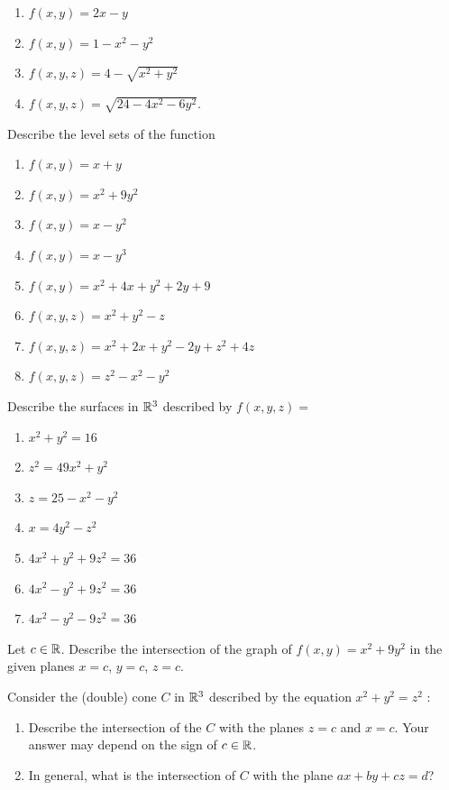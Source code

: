 \begin{exerciselist}
\begin{enumerate}[label=(\alph*)]
        \item $f(x,y)=2x-y$
        \item $f(x,y)=1-x^2-y^2$
        \item $f(x,y,z)=4-\sqrt{x^2+y^2}$
        \item $f(x,y,z)=\sqrt{24-4x^2-6y^2}$.
    \end{enumerate}
    \item Describe the level sets of the function \begin{enumerate}[label=(\alph*)]
        \item $f(x,y)=x+y$
        \item $f(x,y)=x^2+9y^2$
        \item $f(x,y)=x-y^2$
        \item $f(x,y)=x-y^3$
        \item $f(x,y)=x^2+4x+y^2+2y+9$
        \item $f(x,y,z)=x^2+y^2-z$
        \item $f(x,y,z)=x^2+2x+y^2-2y+z^2+4z$
        \item $f(x,y,z)=z^2-x^2-y^2$
    \end{enumerate}
    \item Describe the surfaces in $\mathbb{R}^3$ described by $f(x,y,z)=$ \begin{enumerate}[label=(\alph*)]
        \item $x^2+y^2=16$
        \item $z^2=49x^2+y^2$
        \item $z=25-x^2-y^2$
        \item $x=4y^2-z^2$
        \item $4x^2+y^2+9z^2=36$
        \item $4x^2-y^2+9z^2=36$
        \item $4x^2-y^2-9z^2=36$
    \end{enumerate}
    \item Let $c\in \mathbb{R}$. Describe the intersection of the graph of $f(x,y)=x^2+9y^2$ in the given planes $x=c$, $y=c$, $z=c$.
    \item Consider the (double) cone $C$ in $\mathbb{R}^3$ described by the equation $x^2+y^2=z^2$ :
    \begin{enumerate}[label=(\alph*)]
        \item Describe the intersection of the $C$ with the planes $z=c$ and $x=c$. Your answer may depend on the sign of $c\in \mathbb{R}$.
        \item In general, what is the intersection of $C$ with the plane $ax+by+cz=d$?
    \end{enumerate}
\end{exerciselist}
